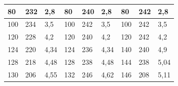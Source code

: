 \documentclass[a4paper,12pt]{article}
\begin{document}
\begin{table}[h]
\begin{center}
\begin{tabular}{|lll|lll|lll|}
\multicolumn{1}{|l|}{80}                                               & \multicolumn{1}{l|}{232}                      & 2,8                      & \multicolumn{1}{l|}{80}                       & \multicolumn{1}{l|}{240}                      & 2,8                      & \multicolumn{1}{l|}{80}                       & \multicolumn{1}{l|}{242}                      & 2,8                      \\ \hline
\multicolumn{1}{|l|}{100}                                              & \multicolumn{1}{l|}{234}                      & 3,5                      & \multicolumn{1}{l|}{100}                      & \multicolumn{1}{l|}{242}                      & 3,5                      & \multicolumn{1}{l|}{100}                      & \multicolumn{1}{l|}{242}                      & 3,5                      \\ \hline
\multicolumn{1}{|l|}{120}                                              & \multicolumn{1}{l|}{228}                      & 4,2                      & \multicolumn{1}{l|}{120}                      & \multicolumn{1}{l|}{240}                      & 4,2                      & \multicolumn{1}{l|}{120}                      & \multicolumn{1}{l|}{242}                      & 4,2                      \\ \hline
\multicolumn{1}{|l|}{124}                                              & \multicolumn{1}{l|}{220}                      & 4,34                     & \multicolumn{1}{l|}{124}                      & \multicolumn{1}{l|}{236}                      & 4,34                     & \multicolumn{1}{l|}{140}                      & \multicolumn{1}{l|}{240}                      & 4,9                      \\ \hline
\multicolumn{1}{|l|}{128}                                              & \multicolumn{1}{l|}{218}                      & 4,48                     & \multicolumn{1}{l|}{128}                      & \multicolumn{1}{l|}{238}                      & 4,48                     & \multicolumn{1}{l|}{144}                      & \multicolumn{1}{l|}{238}                      & 5,04                     \\ \hline
\multicolumn{1}{|l|}{130}                                              & \multicolumn{1}{l|}{206}                      & 4,55                     & \multicolumn{1}{l|}{132}                      & \multicolumn{1}{l|}{246}                      & 4,62                     & \multicolumn{1}{l|}{146}                      & \multicolumn{1}{l|}{208}                      & 5,11                     \\ \hline

\end{tabular}
\end{center}
\end{table}
\end{document}
